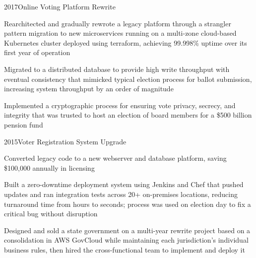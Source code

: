 \project
  {2017}{Online Voting Platform Rewrite}
  {\begin{achievements}
    \item Rearchitected and gradually rewrote a legacy platform through a strangler pattern migration to new microservices running on a multi-zone cloud-based Kubernetes cluster deployed using terraform, achieving 99.998\% uptime over its first year of operation
    \item Migrated to a distributed database to provide high write throughput with eventual consistency that mimicked typical election process for ballot submission, increasing system throughput by an order of magnitude
    \item Implemented a cryptographic process for ensuring vote privacy, secrecy, and integrity that was trusted to host an election of board members for a \$500 billion pension fund
   \end{achievements}}

\project
  {2015}{Voter Registration System Upgrade}
  {\begin{achievements}
    \item Converted legacy code to a new webserver and database platform, saving \$100,000 annually in licensing
    \item Built a zero-downtime deployment system using Jenkins and Chef that pushed updates and ran integration tests across 20+ on-premises locations, reducing turnaround time from hours to seconds; process was used on election day to fix a critical bug without disruption
    \item Designed and sold a state government on a multi-year rewrite project based on a consolidation in AWS GovCloud while maintaining each jurisdiction's individual business rules, then hired the cross-functional team to implement and deploy it
  \end{achievements}}
